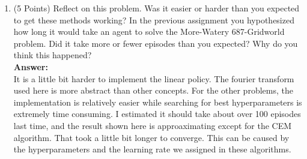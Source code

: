 \documentclass[]{article}
\begin{document}
\begin{enumerate}
    \item (5 Points) Reflect on this problem. Was it easier or harder than you expected to get these methods working? In the previous assignment you hypothesized how long it would take an agent to solve the More-Watery 687-Gridworld problem. Did it take more or fewer episodes than you expected? Why do you think this happened?\\
    \textbf{Answer:}\\
    It is a little bit harder to implement the linear policy. The fourier transform used here is more abstract than other concepts. For the other problems, the implementation is relatively easier while searching for best hyperparameters is extremely time consuming. I estimated it should take about over 100 episodes last time, and the result shown here is approaximating except for the CEM algorithm. That took a little bit longer to converge. This can be caused by the hyperparameters and the learning rate we assigned in these algorithms.
\end{enumerate}


\end{document}
